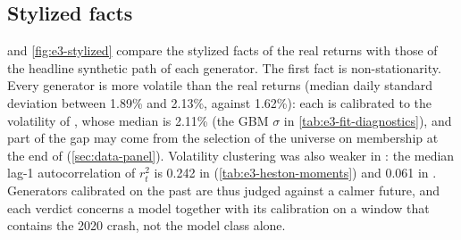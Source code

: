 \begin{table}[tbp]
  \centering
  \caption{Key parameters of the univariate generators fitted on \TRAIN{} (E3, 100 tickers, one
    fit per ticker and generator).}
  \label{tab:e3-fit-diagnostics}
  \small
\end{table}

\subsection{Stylized facts}\label{sec:data-stylized}

 and \cref{fig:e3-stylized} compare the stylized facts
\citep{cont2001empirical} of the real \TEST{} returns with those of the headline synthetic path
of each generator. The first fact is non-stationarity. Every generator is more volatile than the
real \TEST{} returns (median daily standard deviation between 1.89\% and 2.13\%, against
1.62\%): each is calibrated to the volatility of \TRAIN{}, whose median is 2.11\% (the GBM
$\sigma$ in \cref{tab:e3-fit-diagnostics}), and part of the gap may come from the selection of
the universe on membership at the end of \TEST{} (\cref{sec:data-panel}). Volatility clustering
was also weaker in \TEST{}: the median lag-1 autocorrelation of $r_t^2$ is 0.242 in \TRAIN{}
(\cref{tab:e3-heston-moments}) and 0.061 in \TEST{}. Generators calibrated on the past are thus
judged against a calmer future, and each verdict concerns a model together with its calibration
on a window that contains the 2020 crash, not the model class alone.

